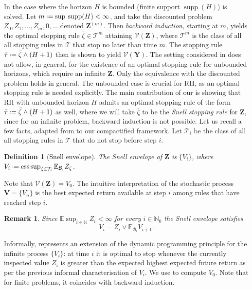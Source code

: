 \documentclass[11pt, a4paper, twoside]{article}
\newcommand*{\defeq}{\mathrel{\vcenter{\baselineskip0.5ex \lineskiplimit0pt
			\hbox{\scriptsize.}\hbox{\scriptsize.}}}=}
\newcommand{\ssup}[1]{{\scriptscriptstyle{({#1})}}}
\newcommand{\NN}{\mathbb{N}}
\newcommand{\EE}{\mathbb{E}}
\newcommand{\TT}{\mathcal{T}}
\newcommand{\Val}{\mathcal{V}}
\newcommand{\YY}{\mathbf{Y}}
\newcommand{\VV}{\mathbf{V}}
\newcommand{\DZ}{\mathbf{Z}}
\newcommand{\DF}{\mathcal{B}}
\DeclareMathOperator*{\esup}{ess\,sup} \DeclareMathOperator{\supp}{supp}
\newtheorem{remark}{Remark}[section]
\newtheorem{definition}{Definition}[section]
\numberwithin{equation}{section}
\begin{document}
	In \cite{Sam96} the case where the horizon $H$ is bounded (finite support $\supp(H)$) is solved. Let $m\defeq\sup\: \supp(H)<\infty$, and take the discounted problem $Z_0, Z_1, \ldots, Z_m, 0,\ldots$ denoted $\DZ^\ssup{m}$. Then \textit{backward induction}, starting at $m$, yields the optimal stopping rule $\bar{\zeta}\in\TT^m$ attaining $\Val(\DZ)$, where $\TT^m$ is the class of all all stopping rules in $\TT$ that stop no later than time $m$. The stopping rule $\bar{\tau}\defeq \bar{\zeta}\wedge (H+1)$ then is shown to yield $\Val(\YY)$. The setting considered in \cite{Sam96} does not allow, in general, for the existence of an optimal stopping rule for unbounded horizons, which require an infinite $\DZ$. Only the equivalence with the discounted problem holds in general. The unbounded case is crucial for RH, as an optimal stopping rule is needed explicitly. The main contribution of our  is showing that RH with unbounded horizon $H$ admits an optimal stopping rule of the form $\bar{\tau}\defeq \bar{\zeta}\wedge (H+1)$ as well, where we will take $\bar{\zeta}$ to be the \textit{Snell stopping rule} for $\DZ$, since for an infinite problem, backward induction is not possible. Let us recall a few facts, adapted from \cite{ChoRob63,ChoRobSieg71} to our compactified framework. Let $\TT_i$ be the class of all all stopping rules in $\TT$ that do not stop before step $i$.
	\begin{definition}[Snell envelope]
		The \emph{Snell envelope} of $\DZ$ is $\{V_i\}$, where $V_i\defeq\esup_{\zeta\in\TT_i}\EE_{\DF_i}Z_\zeta$.
	\end{definition}
	Note that $\Val(\DZ)=V_0$. The intuitive interpretation of the stochastic process $\VV=\{V_n\}$ is the best expected return available at step $i$ among rules that have reached step $i$.
	\begin{remark}\label{snell}
		Since $\EE \sup_{i\in\NN} Z_i<\infty$ for every $i\in\NN_0$ the Snell envelope satisfies 
		\begin{equation}\label{dpe}
			V_i=Z_i\vee\EE_{\DF_i}V_{i+1}.
		\end{equation}
	\end{remark}
	Informally,  represents an extension of the dynamic programming principle for the infinite process $\{V_i\}$: at time $i$ it is optimal to stop whenever the currently inspected value $Z_i$ is greater than the expected highest expected future return as per the previous informal characterisation of $V_i$. We use  to compute $V_0$. Note that for finite problems, it coincides with backward induction.
\end{document}
